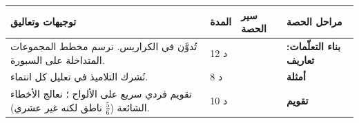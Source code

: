 \documentclass[12pt,a4paper]{article}
\newenvironment{LTR}{\begin{otherlanguage}{english}}{\end{otherlanguage}}
\newcommand{\ar}[1]{\foreignlanguage{arabic}{#1}}
\renewcommand{\ldots}{\mathinner{\ldotp\ldotp\ldotp}}
\newcommand{\N}{\mathbb{N}}
\newcommand{\Z}{\mathbb{Z}}
\newcommand{\D}{\mathbb{D}}
\newcommand{\Q}{\mathbb{Q}}
\newcommand{\R}{\mathbb{R}}
\newcommand{\bx}[1]{\ensuremath{\colorbox{cDef!12}{$\displaystyle #1$}}}
\newcommand{\Phase}[1]{\textbf{#1}}
\newenvironment{Sayr}{%
\begin{LTR}\renewcommand{\arraystretch}{1.25}
\begin{longtable}{|p{0.17\textwidth}|>{\centering\arraybackslash}p{0.06\textwidth}|p{0.53\textwidth}|>{\centering\arraybackslash}p{0.12\textwidth}|}
\hline\rowcolor{cThm!12}\ar{\textbf{توجيهات وتعاليق}} & \ar{\textbf{المدة}} & \ar{\textbf{سير الحصة}} & \ar{\textbf{مراحل الحصة}}\\\hline\endhead
\hline\endfoot}{\end{longtable}\end{LTR}}
\newcommand{\Row}[4]{\ar{\small #4} & \ar{#3} & \ar{#2} & \cellcolor{cThm!8}\ar{\Phase{#1}}\\\hline}
\begin{document}
\begin{Sayr}
\Row{بناء التعلّمات: تعاريف}{%
\begin{itemize}
\item $\N=\{0;1;2;\ldots\}$: مجموعة \textbf{الأعداد الطبيعية}.
\item $\Z=\{\ldots;-2;-1;0;1;2;\ldots\}$: مجموعة \textbf{الأعداد الصحيحة النسبية}.
\item $\D$: مجموعة \textbf{الأعداد العشرية} ، أي الأعداد التي تُكتب $\dfrac{a}{10^{n}}$ حيث $a\in\Z$ و $n\in\N$.
\item $\Q$: مجموعة \textbf{الأعداد الناطقة} ، أي الأعداد التي تُكتب $\dfrac{a}{b}$ حيث $a\in\Z$ و $b\in\Z^{*}$.
\item $\R$: مجموعة \textbf{الأعداد الحقيقية} (فواصل نقط المستقيم العددي). العدد الحقيقي غير الناطق يسمى \textbf{أصمّ}.
\end{itemize}
\textbf{خاصية:} \bx{\N\subset\Z\subset\D\subset\Q\subset\R}. \quad \textbf{ترميز:} $3\in\N$ ، $\frac23\notin\D$ ، $\R^{*}=\R-\{0\}$ ، $\R_{+}$ ، $\R_{-}$.}{12 د}{تُدوَّن في الكراريس. نرسم مخطط المجموعات المتداخلة على السبورة.}
\Row{أمثلة}{%
\begin{itemize}
\item $\frac{7}{4}=1{,}75=\frac{175}{100}$: إذن $\frac74\in\D$.
\item $\frac{1}{3}\in\Q$ و $\frac13\notin\D$.
\item $-\sqrt{16}=-4\in\Z$ و $-4\notin\N$.
\item $1+\sqrt2\notin\Q$ ، و $1+\sqrt2\in\R$.
\end{itemize}}{8 د}{نُشرك التلاميذ في تعليل كل انتماء.}
\Row{تقويم}{%
\textbf{تمرين:} أكمل بأحد الرمزين $\in$ أو $\notin$:\quad
$-5\ldots\N$ ؛ $\frac{9}{3}\ldots\N$ ؛ $0{,}3\ldots\D$ ؛ $\frac{5}{6}\ldots\D$ ؛ $\sqrt{25}\ldots\Z$ ؛ $\pi\ldots\Q$.\par
\textbf{الحل:} $\notin$ ؛ $\in$ ؛ $\in$ ؛ $\notin$ ؛ $\in$ ؛ $\notin$.\par
\textbf{واجب منزلي:} تمارين من الكتاب المدرسي حول مجموعات الأعداد (يختارها الأستاذ).}{10 د}{تقويم فردي سريع على الألواح ؛ نعالج الأخطاء الشائعة ($\frac56$ ناطق لكنه غير عشري).}
\end{Sayr}
\end{document}
